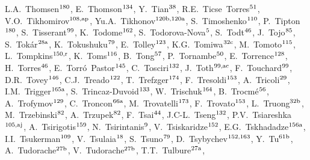 \begin{flushleft}
L.A.~Thomsen$^\textrm{\scriptsize 180}$,    
E.~Thomson$^\textrm{\scriptsize 134}$,    
Y.~Tian$^\textrm{\scriptsize 38}$,    
R.E.~Ticse~Torres$^\textrm{\scriptsize 51}$,    
V.O.~Tikhomirov$^\textrm{\scriptsize 108,ap}$,    
Yu.A.~Tikhonov$^\textrm{\scriptsize 120b,120a}$,    
S.~Timoshenko$^\textrm{\scriptsize 110}$,    
P.~Tipton$^\textrm{\scriptsize 180}$,    
S.~Tisserant$^\textrm{\scriptsize 99}$,    
K.~Todome$^\textrm{\scriptsize 162}$,    
S.~Todorova-Nova$^\textrm{\scriptsize 5}$,    
S.~Todt$^\textrm{\scriptsize 46}$,    
J.~Tojo$^\textrm{\scriptsize 85}$,    
S.~Tok\'ar$^\textrm{\scriptsize 28a}$,    
K.~Tokushuku$^\textrm{\scriptsize 79}$,    
E.~Tolley$^\textrm{\scriptsize 123}$,    
K.G.~Tomiwa$^\textrm{\scriptsize 32c}$,    
M.~Tomoto$^\textrm{\scriptsize 115}$,    
L.~Tompkins$^\textrm{\scriptsize 150,r}$,    
K.~Toms$^\textrm{\scriptsize 116}$,    
B.~Tong$^\textrm{\scriptsize 57}$,    
P.~Tornambe$^\textrm{\scriptsize 50}$,    
E.~Torrence$^\textrm{\scriptsize 128}$,    
H.~Torres$^\textrm{\scriptsize 46}$,    
E.~Torr\'o~Pastor$^\textrm{\scriptsize 145}$,    
C.~Tosciri$^\textrm{\scriptsize 132}$,    
J.~Toth$^\textrm{\scriptsize 99,ac}$,    
F.~Touchard$^\textrm{\scriptsize 99}$,    
D.R.~Tovey$^\textrm{\scriptsize 146}$,    
C.J.~Treado$^\textrm{\scriptsize 122}$,    
T.~Trefzger$^\textrm{\scriptsize 174}$,    
F.~Tresoldi$^\textrm{\scriptsize 153}$,    
A.~Tricoli$^\textrm{\scriptsize 29}$,    
I.M.~Trigger$^\textrm{\scriptsize 165a}$,    
S.~Trincaz-Duvoid$^\textrm{\scriptsize 133}$,    
W.~Trischuk$^\textrm{\scriptsize 164}$,    
B.~Trocm\'e$^\textrm{\scriptsize 56}$,    
A.~Trofymov$^\textrm{\scriptsize 129}$,    
C.~Troncon$^\textrm{\scriptsize 66a}$,    
M.~Trovatelli$^\textrm{\scriptsize 173}$,    
F.~Trovato$^\textrm{\scriptsize 153}$,    
L.~Truong$^\textrm{\scriptsize 32b}$,    
M.~Trzebinski$^\textrm{\scriptsize 82}$,    
A.~Trzupek$^\textrm{\scriptsize 82}$,    
F.~Tsai$^\textrm{\scriptsize 44}$,    
J.C-L.~Tseng$^\textrm{\scriptsize 132}$,    
P.V.~Tsiareshka$^\textrm{\scriptsize 105,aj}$,    
A.~Tsirigotis$^\textrm{\scriptsize 159}$,    
N.~Tsirintanis$^\textrm{\scriptsize 9}$,    
V.~Tsiskaridze$^\textrm{\scriptsize 152}$,    
E.G.~Tskhadadze$^\textrm{\scriptsize 156a}$,    
I.I.~Tsukerman$^\textrm{\scriptsize 109}$,    
V.~Tsulaia$^\textrm{\scriptsize 18}$,    
S.~Tsuno$^\textrm{\scriptsize 79}$,    
D.~Tsybychev$^\textrm{\scriptsize 152,163}$,    
Y.~Tu$^\textrm{\scriptsize 61b}$,    
A.~Tudorache$^\textrm{\scriptsize 27b}$,    
V.~Tudorache$^\textrm{\scriptsize 27b}$,    
T.T.~Tulbure$^\textrm{\scriptsize 27a}$,    

\end{flushleft}
